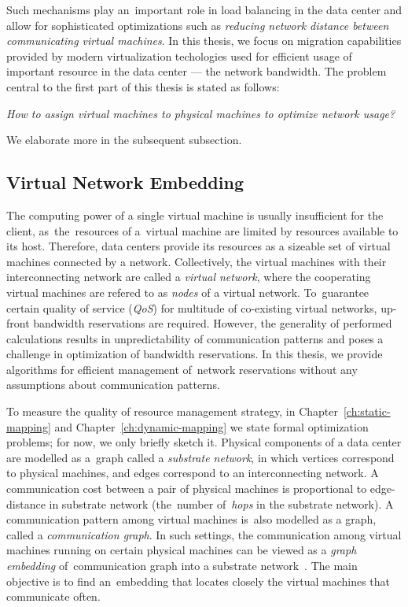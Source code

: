 Such mechanisms play an~important role in load balancing in the data center and allow for sophisticated optimizations such as \emph{reducing network distance between communicating virtual machines}.
In this thesis, we focus on migration capabilities provided by modern virtualization techologies used for efficient usage of important resource in the data center --- the network bandwidth.
The problem central to the first part of this thesis is stated as follows:

\begin{center}
  \emph{How to assign virtual machines to physical machines to optimize network
  usage?}
\end{center}
We elaborate more in the subsequent subsection.

\subsection{Virtual Network Embedding}
\label{sec:virt_net_emb}

The computing power of a single virtual machine is usually insufficient for the client, as~the~resources of a~virtual machine are limited by resources available to its host.
Therefore, data centers provide its resources as a sizeable set of virtual machines connected by a network.
Collectively, the virtual machines with their interconnecting network are called a \emph{virtual network}, where the cooperating virtual machines are refered to as \emph{nodes} of a virtual network.
To~guarantee certain quality of service (\emph{QoS}) for multitude of co-existing virtual networks, up-front bandwidth reservations are required.
However, the generality of performed calculations results in unpredictability of communication patterns and poses a challenge in optimization of bandwidth reservations.
In this thesis, we provide algorithms for efficient management of~network reservations without any assumptions about communication patterns.

To measure the quality of resource management strategy, in Chapter~\ref{ch:static-mapping} and Chapter~\ref{ch:dynamic-mapping} we state formal optimization problems; for now, we only briefly sketch it.
Physical components of a data center are modelled as a~graph called a \emph{substrate network}, in which vertices correspond to physical machines, and edges correspond to an interconnecting network.
A communication cost between a pair of physical machines is proportional to edge-distance in substrate network (the~number of~\emph{hops} in the substrate network).
A communication pattern among virtual machines is~also modelled as a graph, called a \emph{communication graph}.
In such settings, the communication among virtual machines running on certain physical machines can be viewed as a \emph{graph embedding} of~communication graph into a substrate network~\cite{gupta2001provisioning}.
The main objective is to find an~embedding that locates closely the virtual machines that communicate often.

